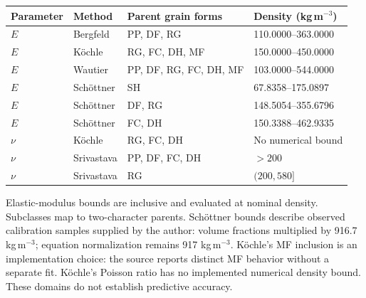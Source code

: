 \begin{tabularx}{\linewidth}{@{}llXl@{}}
\toprule
Parameter & Method & Parent grain forms & Density (kg\,m$^{-3}$) \\
\midrule
$E$ & Bergfeld & PP, DF, RG & 110.0000--363.0000 \\
$E$ & K\"ochle & RG, FC, DH, MF & 150.0000--450.0000 \\
$E$ & Wautier & PP, DF, RG, FC, DH, MF & 103.0000--544.0000 \\
$E$ & Sch\"ottner & SH & 67.8358--175.0897 \\
$E$ & Sch\"ottner & DF, RG & 148.5054--355.6796 \\
$E$ & Sch\"ottner & FC, DH & 150.3388--462.9335 \\
$\nu$ & K\"ochle & RG, FC, DH & No numerical bound \\
$\nu$ & Srivastava & PP, DF, FC, DH & $>200$ \\
$\nu$ & Srivastava & RG & $(200,580]$ \\
\bottomrule
\end{tabularx}

\smallskip
{\footnotesize Elastic-modulus bounds are inclusive and evaluated at nominal density.
Subclasses map to two-character parents. Sch\"ottner bounds describe observed
calibration samples supplied by the author: volume fractions multiplied by
916.7 kg\,m$^{-3}$; equation normalization remains 917 kg\,m$^{-3}$.
K\"ochle's MF inclusion is an implementation choice: the source reports distinct
MF behavior without a separate fit. K\"ochle's Poisson ratio has no implemented
numerical density bound. These domains do not establish predictive accuracy.}
